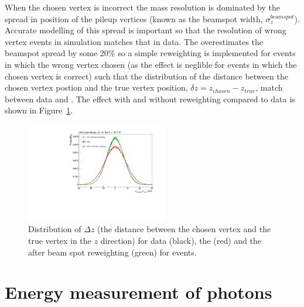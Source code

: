 When the chosen vertex is incorrect the mass resolution is dominated by the spread in position of the pileup vertices (known as the beamspot width, $\sigma_{z}^{beamspot}$). Accurate modelling of this spread is important so that the resolution of wrong vertex events in simulation matches that in data. The \MC overestimates the beamspot spread by some 20\% so a simple reweighting is implemented for \MC events in which the wrong vertex chosen (as the effect is neglible for events in which the chosen vertex is correct) such that the distribution of the distance between the chosen vertex postion and the true vertex position, $\delta z=z_{chosen}-z_{true}$, match between data and \MC. The effect with and without reweighting compared to data is shown in Figure~\ref{fig:beamspot}.

\begin{figure}
  \begin{center}
  \includegraphics[width=0.55\textwidth]{analysis_comps/plots/beamspot.pdf}
  \caption[Distribution of $\Delta z$ (the distance between the chosen vertex and the true vertex in the $z$ direction]{Distribution of $\Delta z$ (the distance between the chosen vertex and the true vertex in the $z$ direction) for data (black), the \MC (red) and the \MC after beam spot reweighting (green) for \Zmumu events.}
  \label{fig:beamspot}
  \end{center}
\end{figure}

\section{Energy measurement of photons}
\label{sec:photon_energy}

